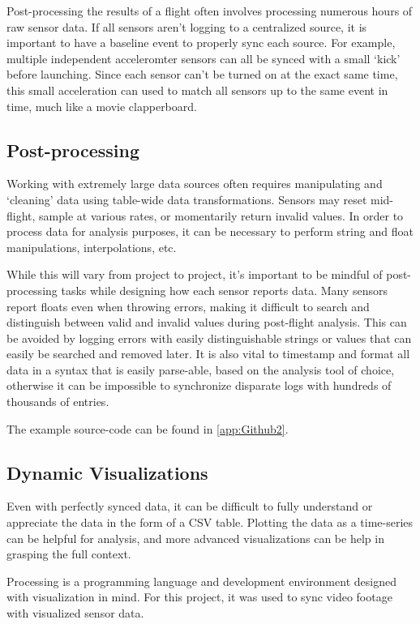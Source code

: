 \documentclass[heading.tex]{subfiles}
\begin{document}
Post-processing the results of a flight often involves processing numerous
hours of raw sensor data. If all sensors aren't logging to a centralized source,
it is important to have a baseline event to properly sync each source. For
example, multiple independent acceleromter sensors can all be synced with a
small `kick' before launching. Since each sensor can't be turned on at the exact
same time, this small acceleration can used to match all sensors up to the same
event in time, much like a movie clapperboard.

\subsection{Post-processing}

Working with extremely large data sources often requires manipulating and
`cleaning' data using table-wide data transformations. Sensors may reset
mid-flight, sample at various rates, or momentarily return invalid values.
In order to process data for analysis purposes, it can be necessary to perform
string and float manipulations, interpolations, etc.

While this will vary from project to project, it's important to be mindful of
post-processing tasks while designing how each sensor reports data.
Many sensors report floats even when throwing errors, making it difficult to
search and distinguish between valid and invalid values during post-flight
analysis. This can be avoided by logging errors with easily distinguishable
strings or values that can easily be searched and removed later. It is also
vital to timestamp and format all data in a syntax that is easily parse-able,
based on the analysis tool of choice, otherwise it can be
impossible to synchronize disparate logs with hundreds of thousands of entries.

The example source-code can be found in \cref{app:Github2}.

\subsection{Dynamic Visualizations}

Even with perfectly synced data, it can be difficult to fully understand or 
appreciate the data in the form of a CSV table. Plotting the data as a
time-series can be helpful for analysis, and more advanced visualizations can
be help in grasping the full context.

Processing is a programming language and development environment designed
with visualization in mind. For this project, it was used to sync video
footage with visualized sensor data. 
\end{document}
